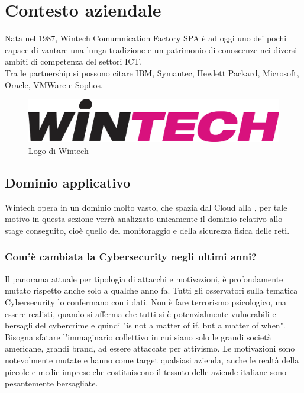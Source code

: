\documentclass[Tesi.tex]{subfiles}
\begin{document}
\setcounter{chapter}{0}
\chapter{Contesto aziendale}

Nata nel 1987, Wintech Comumnication Factory SPA è ad oggi uno dei pochi  capace di vantare una lunga tradizione e un patrimonio di conoscenze nei diversi ambiti di competenza del settori ICT. \\
Tra le partnership si possono citare IBM, Symantec, Hewlett Packard, Microsoft, Oracle, VMWare e Sophos.
\begin{figure}[H]
	\centering
	\includegraphics[width=0.7\linewidth]{"images/LogoWintech"}
	\caption{Logo di Wintech}
	\label{fig:Logo di Wintech}
\end{figure}

\section{Dominio applicativo}
Wintech opera in un dominio molto vasto, che spazia dal Cloud alla , per tale motivo in questa sezione verrà analizzato unicamente il dominio relativo allo stage conseguito, cioè quello del monitoraggio e della sicurezza fisica delle reti. \\

\subsection{Com'è cambiata la Cybersecurity negli ultimi anni?}
Il panorama attuale per tipologia di attacchi e motivazioni, è profondamente mutato rispetto anche solo a qualche anno fa. Tutti gli osservatori sulla tematica Cybersecurity lo confermano con i dati. Non è fare terrorismo psicologico, ma essere realisti, quando si afferma che tutti si è potenzialmente vulnerabili e bersagli del cybercrime e quindi "is not a matter of if, but a matter of when". Bisogna sfatare l'immaginario collettivo in cui siano solo le grandi società americane, grandi brand, ad essere attaccate per attivismo. Le motivazioni sono notevolmente mutate e hanno come target qualsiasi azienda, anche le realtà della piccole e medie imprese che costituiscono il tessuto delle aziende italiane sono pesantemente bersagliate.
\end{document}
